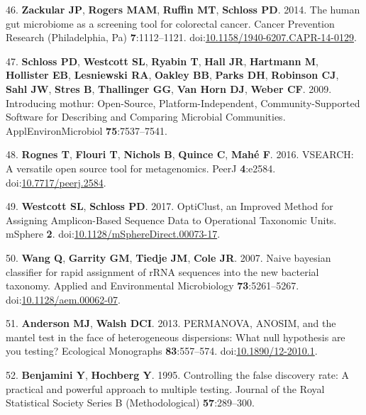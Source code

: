 \documentclass[12pt,]{article}
\begin{document}
\hypertarget{ref-zackular_human_2014}{}
46. \textbf{Zackular JP}, \textbf{Rogers MAM}, \textbf{Ruffin MT},
\textbf{Schloss PD}. 2014. The human gut microbiome as a screening tool
for colorectal cancer. Cancer Prevention Research (Philadelphia, Pa)
\textbf{7}:1112--1121.
doi:\href{https://doi.org/10.1158/1940-6207.CAPR-14-0129}{10.1158/1940-6207.CAPR-14-0129}.

\hypertarget{ref-schloss_introducing_2009}{}
47. \textbf{Schloss PD}, \textbf{Westcott SL}, \textbf{Ryabin T},
\textbf{Hall JR}, \textbf{Hartmann M}, \textbf{Hollister EB},
\textbf{Lesniewski RA}, \textbf{Oakley BB}, \textbf{Parks DH},
\textbf{Robinson CJ}, \textbf{Sahl JW}, \textbf{Stres B},
\textbf{Thallinger GG}, \textbf{Van Horn DJ}, \textbf{Weber CF}. 2009.
Introducing mothur: Open-Source, Platform-Independent,
Community-Supported Software for Describing and Comparing Microbial
Communities. ApplEnvironMicrobiol \textbf{75}:7537--7541.

\hypertarget{ref-rognes_vsearch_2016}{}
48. \textbf{Rognes T}, \textbf{Flouri T}, \textbf{Nichols B},
\textbf{Quince C}, \textbf{Mahé F}. 2016. VSEARCH: A versatile open
source tool for metagenomics. PeerJ \textbf{4}:e2584.
doi:\href{https://doi.org/10.7717/peerj.2584}{10.7717/peerj.2584}.

\hypertarget{ref-westcott_opticlust_2017}{}
49. \textbf{Westcott SL}, \textbf{Schloss PD}. 2017. OptiClust, an
Improved Method for Assigning Amplicon-Based Sequence Data to
Operational Taxonomic Units. mSphere \textbf{2}.
doi:\href{https://doi.org/10.1128/mSphereDirect.00073-17}{10.1128/mSphereDirect.00073-17}.

\hypertarget{ref-rdp_Wang2007}{}
50. \textbf{Wang Q}, \textbf{Garrity GM}, \textbf{Tiedje JM},
\textbf{Cole JR}. 2007. Naive bayesian classifier for rapid assignment
of rRNA sequences into the new bacterial taxonomy. Applied and
Environmental Microbiology \textbf{73}:5261--5267.
doi:\href{https://doi.org/10.1128/aem.00062-07}{10.1128/aem.00062-07}.

\hypertarget{ref-permanova_Anderson2013}{}
51. \textbf{Anderson MJ}, \textbf{Walsh DCI}. 2013. PERMANOVA, ANOSIM,
and the mantel test in the face of heterogeneous dispersions: What null
hypothesis are you testing? Ecological Monographs \textbf{83}:557--574.
doi:\href{https://doi.org/10.1890/12-2010.1}{10.1890/12-2010.1}.

\hypertarget{ref-benjamini_controlling_1995}{}
52. \textbf{Benjamini Y}, \textbf{Hochberg Y}. 1995. Controlling the
false discovery rate: A practical and powerful approach to multiple
testing. Journal of the Royal Statistical Society Series B
(Methodological) \textbf{57}:289--300.
\end{document}
